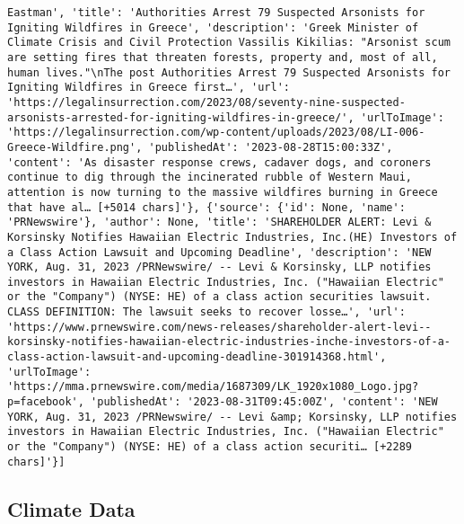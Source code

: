 \documentclass[
  letterpaper,
  DIV=11,
  numbers=noendperiod]{scrartcl}
\begin{document}
\begin{verbatim}
Eastman', 'title': 'Authorities Arrest 79 Suspected Arsonists for Igniting Wildfires in Greece', 'description': 'Greek Minister of Climate Crisis and Civil Protection Vassilis Kikilias: "Arsonist scum are setting fires that threaten forests, property and, most of all, human lives."\nThe post Authorities Arrest 79 Suspected Arsonists for Igniting Wildfires in Greece first…', 'url': 'https://legalinsurrection.com/2023/08/seventy-nine-suspected-arsonists-arrested-for-igniting-wildfires-in-greece/', 'urlToImage': 'https://legalinsurrection.com/wp-content/uploads/2023/08/LI-006-Greece-Wildfire.png', 'publishedAt': '2023-08-28T15:00:33Z', 'content': 'As disaster response crews, cadaver dogs, and coroners continue to dig through the incinerated rubble of Western Maui, attention is now turning to the massive wildfires burning in Greece that have al… [+5014 chars]'}, {'source': {'id': None, 'name': 'PRNewswire'}, 'author': None, 'title': 'SHAREHOLDER ALERT: Levi & Korsinsky Notifies Hawaiian Electric Industries, Inc.(HE) Investors of a Class Action Lawsuit and Upcoming Deadline', 'description': 'NEW YORK, Aug. 31, 2023 /PRNewswire/ -- Levi & Korsinsky, LLP notifies investors in Hawaiian Electric Industries, Inc. ("Hawaiian Electric" or the "Company") (NYSE: HE) of a class action securities lawsuit. CLASS DEFINITION: The lawsuit seeks to recover losse…', 'url': 'https://www.prnewswire.com/news-releases/shareholder-alert-levi--korsinsky-notifies-hawaiian-electric-industries-inche-investors-of-a-class-action-lawsuit-and-upcoming-deadline-301914368.html', 'urlToImage': 'https://mma.prnewswire.com/media/1687309/LK_1920x1080_Logo.jpg?p=facebook', 'publishedAt': '2023-08-31T09:45:00Z', 'content': 'NEW YORK, Aug. 31, 2023 /PRNewswire/ -- Levi &amp; Korsinsky, LLP notifies investors in Hawaiian Electric Industries, Inc. ("Hawaiian Electric" or the "Company") (NYSE: HE) of a class action securiti… [+2289 chars]'}]
\end{verbatim}

\hypertarget{climate-data}{%
\subsection{Climate Data}\label{climate-data}}
\end{document}
